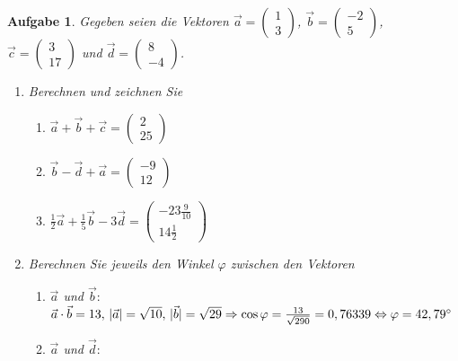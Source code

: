 \documentclass[12pt]{article}
\newtheorem{exercise}[satz]{Aufgabe}
\begin{document}
\begin{exercise}
  Gegeben seien die Vektoren
  $\vec{a}=\left(\begin{array}{r} 1 \\ 3 \end{array}\right)$,
  $\vec{b}=\left(\begin{array}{r} -2 \\ 5 \end{array}\right)$,\\
  $\vec{c}=\left(\begin{array}{r} 3 \\ 17 \end{array}\right)$ und
  $\vec{d}=\left(\begin{array}{r} 8 \\ -4 \end{array}\right)$.
  \begin{enumerate}
    \item[(a)] Berechnen und zeichnen Sie
      \begin{enumerate}
      \item[(i)] $\vec{a}+\vec{b}+\vec{c}=\left(\begin{array}{r} 2 \\ 25 \end{array}            \right)$
      \item[(ii)] $\vec{b}-\vec{d}+\vec{a}=\left(\begin{array}{r} -9 \\ 12 \end{array}              \right)$
      \item[(iii)] $\frac{1}{2}\vec{a}+\frac{1}{5}\vec{b}-3\vec{d}=\left(\begin{array}{r} -23\frac{9}{10} \\ 14\frac{1}{2} \end{array}\right)$
      \end{enumerate}
    \item[(b)] Berechnen Sie jeweils den Winkel $\varphi$ zwischen den Vektoren
      \begin{enumerate}
        \item[(i)] $\vec{a}$ und $\vec{b}:$\\
                   $\vec{a}\cdot\vec{b}=13, \,\vert\vec{a}\vert=\sqrt{10}, \, \vert\vec{b}\vert=\sqrt{29} \\ 
                   \Rightarrow \cos{\varphi}=\frac{13}{\sqrt{290}}=0,76339 \Leftrightarrow \varphi = 42,79^\circ$
        \item[(ii)] $\vec{a}$ und $\vec{d}:$\\

\end{enumerate}
\end{enumerate}
\end{exercise}
\end{document}
